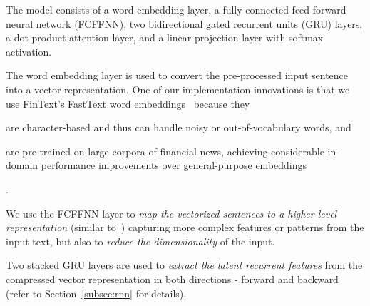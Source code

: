 \begin{minipage}[ht]{0.45\textwidth}
    The model consists of a word embedding layer, a fully-connected feed-forward neural network (FCFFNN), two bidirectional gated recurrent units (GRU) layers, a dot-product attention layer, and a linear projection layer with softmax activation.

    The word embedding layer is used to convert the pre-processed input sentence into a vector representation.
    One of our implementation innovations is that we use FinText's FastText word embeddings~\cite{rahimikia2021realised} because they
    \begin{enumerate*}
        \item are character-based and thus can handle noisy or out-of-vocabulary words, and
        \item are pre-trained on large corpora of financial news, achieving considerable in-domain performance improvements over general-purpose embeddings
    \end{enumerate*}.

    We use the FCFFNN layer to \emph{map the vectorized sentences to a higher-level representation} (similar to~\cite{saikh2020deep}) capturing more complex features or patterns from the input text, but also to \emph{reduce the dimensionality} of the input.

    Two stacked GRU layers are used to \emph{extract the latent recurrent features} from the compressed vector representation in both directions - forward and backward (refer to Section~\ref{subsec:rnn} for details).
\end{minipage}\hfill
